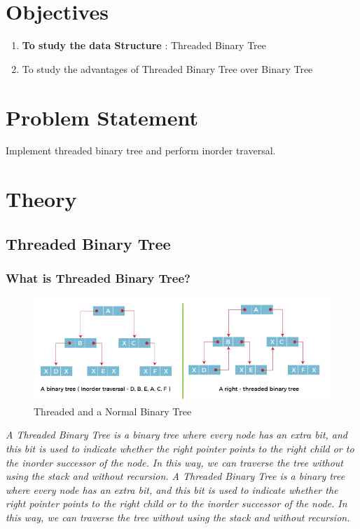 \documentclass[11pt]{article}
\begin{document}
\tableofcontents
\thispagestyle{empty}
\clearpage

\setcounter{page}{1}

\section{Objectives}
\begin{enumerate}
    \item \textbf{To study the data Structure }: Threaded Binary Tree
    \item To study the advantages of Threaded Binary Tree over Binary Tree
\end{enumerate}

\section{Problem Statement}
Implement threaded binary tree and perform inorder traversal.

\section{Theory}
\subsection{Threaded Binary Tree}

\subsubsection{What is Threaded Binary Tree?}

\begin{figure}[H]
    \centering
    \includegraphics[width=1\textwidth]{figures/threaded-binary-tree3.png}
    \caption{Threaded and a Normal Binary Tree}
\end{figure}

\textit{A Threaded Binary Tree is a binary tree where every node has an extra bit, and this bit is used to indicate whether the right pointer points to the right child or to the inorder successor of the node. In this way, we can traverse the tree without using the stack and without recursion. A Threaded Binary Tree is a binary tree where every node has an extra bit, and this bit is used to indicate whether the right pointer points to the right child or to the inorder successor of the node. In this way, we can traverse the tree without using the stack and without recursion.}
\end{document}
